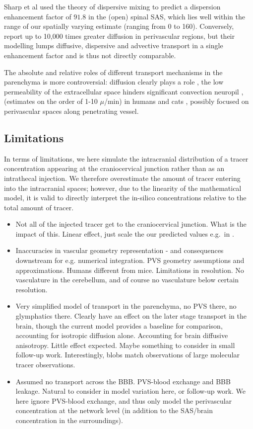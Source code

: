 \documentclass[fleqn,10pt]{wlscirep}
\begin{document}
Sharp et al used the theory of dispersive mixing to predict a dispersion enhancement factor of $91.8$ in the (open) spinal SAS, which lies well within the range of our spatially varying estimate (ranging from 0 to 160). Conversely, \cite{ray2021quantitative} report up to 10,000 times greater diffusion in perivascular regions, but their modelling lumps diffusive, dispersive and advective transport in a single enhancement factor and is thus not directly comparable.

The absolute and relative roles of different transport mechanisms in
the parenchyma is more controversial: diffusion clearly plays a role
\cite{nicolson}, the low permeability of the extracellular space
hinders significant convection neuropil \cite{holter}, (estimates on
the order of 1-10 $\mu$/min) in humans \cite{vinje2023human} and cats
\cite{cserr}, possibly focused on perivascular spaces along
penetrating vessel.
\fi

\subsection*{Limitations}

In terms of limitations, we here simulate the intracranial
distribution of a tracer concentration appearing at the craniocervical
junction rather than as an intrathecal injection. We therefore
overestimate the amount of tracer entering into the intracranial
spaces; however, due to the linearity of the mathematical model, it is
valid to directly interpret the in-silico concentrations relative to
the total amount of tracer.

\begin{itemize}
\item
  Not all of the injected tracer get to the craniocervical
  junction. What is the impact of this. Linear effect, just scale the
  our predicted values e.g.~in .
\item 
  Inaccuracies in vascular geometry representation - and consequences
  downstream for e.g. numerical integration. PVS geometry assumptions
  and approximations. Humans different from mice. Limitations in
  resolution. No vasculature in the cerebellum, and of course no
  vasculature below certain resolution.
\item
  Very simplified model of transport in the parenchyma, no PVS there,
  no glymphatics there. Clearly have an effect on the later stage
  transport in the brain, though the current model provides a baseline
  for comparison, accounting for isotropic diffusion alone.
  Accounting for brain diffusive anisotropy. Little effect
  expected. Maybe something to consider in small follow-up
  work. Interestingly, blobs match observations of large molecular
  tracer observations.
\item
  Assumed no transport across the BBB. PVS-blood exchange and BBB
  leakage. Natural to consider in model variation here, or follow-up
  work. We here ignore PVS-blood exchange, and thus only model the
  perivascular concentration at the network level (in addition to the
  SAS/brain concentration in the surroundings).
\end{itemize}
\end{document}
